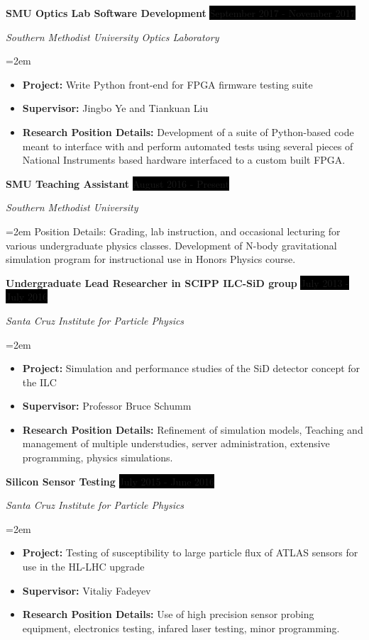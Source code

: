 \documentclass[paper=a4,fontsize=11pt]{scrartcl} %
\newcommand{\sepspace}{\vspace*{1em}}		%
\newcommand{\EducationEntry}[4]{
		\noindent \textbf{#1} \hfill      %
		\colorbox{Black}{%
			\parbox{6em}{%
			\hfill\color{White}#2}} \par  %
		\noindent \textit{#3} \par        %
		\noindent\hangindent=2em\hangafter=0 \small #4 %
		\normalsize \par}
\newcommand{\WorkEntry}[4]{				  %
		\noindent \textbf{#1} \hfill      %
		\colorbox{Black}{\color{White}#2} \par  %
		\noindent \textit{#3} \par              %
		\noindent\hangindent=2em\hangafter=0 \small #4 %
		\normalsize \par}
\begin{document}
    \WorkEntry {SMU Optics Lab Software Development}
        {September 2017 - November 2017}
        {Southern Methodist University Optics Laboratory}
        {\begin{itemize}
            \item[] \textbf{Project:}
                Write Python front-end for FPGA firmware testing suite
            \item[] \textbf{Supervisor:}
                Jingbo Ye and Tiankuan Liu
            \item[] \textbf{Research Position Details:}
                Development of a suite of Python-based code meant to interface with and perform automated tests using several pieces of National Instruments based hardware interfaced to a custom built FPGA.
        \end{itemize}}
    \sepspace

    \WorkEntry {SMU Teaching Assistant}
        {August 2016 - Present}
        {Southern Methodist University}
        { Position Details:
            Grading, lab instruction, and occasional lecturing for various undergraduate physics classes. Development of N-body gravitational simulation program for instructional use in Honors Physics course.
        }
    \sepspace

    \WorkEntry {Undergraduate Lead Researcher in SCIPP ILC-SiD group}
        {July 2013 - July 2016}
        {Santa Cruz Institute for Particle Physics}
        {\begin{itemize}
            \item[] \textbf{Project:}
                Simulation and performance studies of the SiD detector concept for the ILC
            \item[] \textbf{Supervisor:}
                Professor Bruce Schumm
            \item[] \textbf{Research Position Details:}
                Refinement of simulation models, Teaching and management 
                of multiple understudies, server administration,
                extensive programming, physics simulations.
        \end{itemize}}
    \sepspace

    \WorkEntry {Silicon Sensor Testing}
        {July 2015 - June 2016}
        {Santa Cruz Institute for Particle Physics}
        {\begin{itemize}
            \item[] \textbf{Project:}
                Testing of susceptibility to large particle
                flux of ATLAS sensors for use in the HL-LHC upgrade
            \item[] \textbf{Supervisor:}
                Vitaliy Fadeyev
            \item[] \textbf{Research Position Details:}
                Use of high precision sensor probing equipment,
                electronics testing, infared laser testing, minor programming.
        \end{itemize}}
    \sepspace
\end{document}
